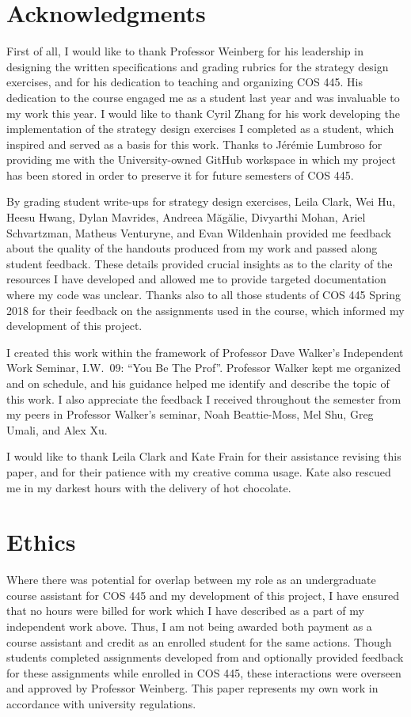\documentclass[pageno]{jpaper}
\begin{document}
\section*{Acknowledgments}
First of all, I would like to thank Professor Weinberg for his leadership in designing the written specifications and grading rubrics for the strategy design exercises, and for his dedication to teaching and organizing COS 445.
His dedication to the course engaged me as a student last year and was invaluable to my work this year.
I would like to thank Cyril Zhang for his work developing the implementation of the strategy design exercises I completed as a student, which inspired and served as a basis for this work.
Thanks to J\'er\'emie Lumbroso for providing me with the University-owned GitHub workspace in which my project has been stored in order to preserve it for future semesters of COS 445.

By grading student write-ups for strategy design exercises, Leila Clark, Wei Hu, Heesu Hwang, Dylan Mavrides, Andreea M\u{a}g\u{a}lie, Divyarthi Mohan, Ariel Schvartzman, Matheus Venturyne, and Evan Wildenhain provided me feedback about the quality of the handouts produced from my work and passed along student feedback.
These details provided crucial insights as to the clarity of the resources I have developed and allowed me to provide targeted documentation where my code was unclear.
Thanks also to all those students of COS 445 Spring 2018 for their feedback on the assignments used in the course, which informed my development of this project.

I created this work within the framework of Professor Dave Walker's Independent Work Seminar, I.W.\ 09: ``You Be The Prof''.
Professor Walker kept me organized and on schedule, and his guidance helped me identify and describe the topic of this work.
I also appreciate the feedback I received throughout the semester from my peers in Professor Walker's seminar, Noah Beattie-Moss, Mel Shu, Greg Umali, and Alex Xu.

I would like to thank Leila Clark and Kate Frain for their assistance revising this paper, and for their patience with my creative comma usage.
Kate also rescued me in my darkest hours with the delivery of hot chocolate.

\section*{Ethics}
Where there was potential for overlap between my role as an undergraduate course assistant for COS 445 and my development of this project, I have ensured that no hours were billed for work which I have described as a part of my independent work above.
Thus, I am not being awarded both payment as a course assistant and credit as an enrolled student for the same actions.
Though students completed assignments developed from and optionally provided feedback for these assignments while enrolled in COS 445, these interactions were overseen and approved by Professor Weinberg.
This paper represents my own work in accordance with university regulations.
\end{document}
